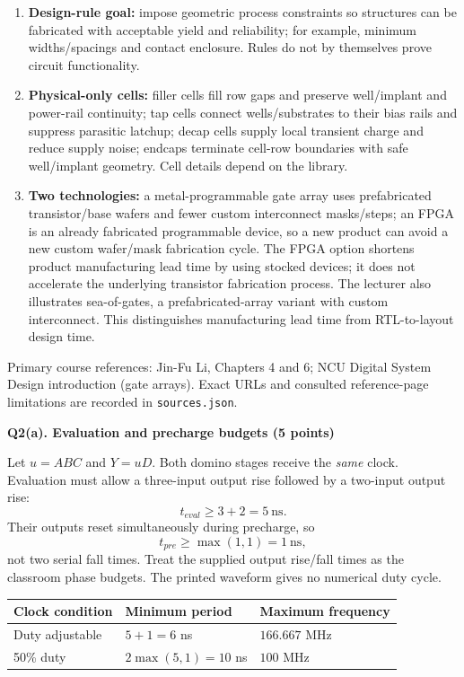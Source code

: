 \documentclass[10pt]{article}
\newcommand{\qheading}[1]{\par\medskip\textbf{#1}\par}
\begin{document}
\begin{enumerate}[label=(\alph*),leftmargin=7mm,itemsep=5pt]
\item \textbf{Design-rule goal:} impose geometric process constraints so structures can be fabricated with acceptable yield and reliability; for example, minimum widths/spacings and contact enclosure. Rules do not by themselves prove circuit functionality.
\item \textbf{Physical-only cells:} filler cells fill row gaps and preserve well/implant and power-rail continuity; tap cells connect wells/substrates to their bias rails and suppress parasitic latchup; decap cells supply local transient charge and reduce supply noise; endcaps terminate cell-row boundaries with safe well/implant geometry. Cell details depend on the library.
\item \textbf{Two technologies:} a metal-programmable gate array uses prefabricated transistor/base wafers and fewer custom interconnect masks/steps; an FPGA is an already fabricated programmable device, so a new product can avoid a new custom wafer/mask fabrication cycle. The FPGA option shortens product manufacturing lead time by using stocked devices; it does not accelerate the underlying transistor fabrication process. The lecturer also illustrates sea-of-gates, a prefabricated-array variant with custom interconnect. This distinguishes manufacturing lead time from RTL-to-layout design time.
\end{enumerate}
\small Primary course references: Jin-Fu Li, Chapters 4 and 6; NCU Digital System Design introduction (gate arrays). Exact URLs and consulted reference-page limitations are recorded in \texttt{sources.json}.\normalsize
\newpage
\qheading{Q2(a). Evaluation and precharge budgets (5 points)}
Let $u=ABC$ and $Y=uD$. Both domino stages receive the \emph{same} clock. Evaluation must allow a three-input output rise followed by a two-input output rise:
\[
t_{eval}\ge3+2=5\ \mathrm{ns}.
\]
Their outputs reset simultaneously during precharge, so
\[
t_{pre}\ge\max(1,1)=1\ \mathrm{ns},
\]
not two serial fall times. Treat the supplied output rise/fall times as the classroom phase budgets. The printed waveform gives no numerical duty cycle.
\begin{center}\begin{tabular}{lll}\toprule
Clock condition&Minimum period&Maximum frequency\\\midrule
Duty adjustable&$5+1=6$ ns&$166.667$ MHz\\
50\% duty&$2\max(5,1)=10$ ns&$100$ MHz\\\bottomrule
\end{tabular}\end{center}
\end{document}
